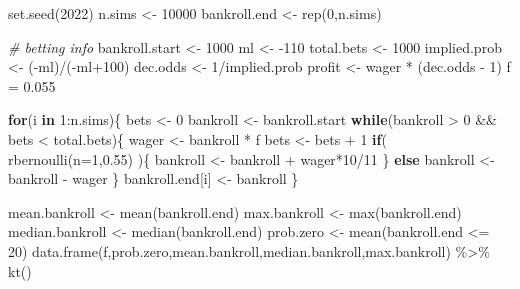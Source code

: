 \documentclass[
  11pt,
]{book}
\newenvironment{Shaded}{\begin{snugshade}}{\end{snugshade}}
\newcommand{\AttributeTok}[1]{\textcolor[rgb]{0.77,0.63,0.00}{#1}}
\newcommand{\CommentTok}[1]{\textcolor[rgb]{0.56,0.35,0.01}{\textit{#1}}}
\newcommand{\ControlFlowTok}[1]{\textcolor[rgb]{0.13,0.29,0.53}{\textbf{#1}}}
\newcommand{\DecValTok}[1]{\textcolor[rgb]{0.00,0.00,0.81}{#1}}
\newcommand{\FloatTok}[1]{\textcolor[rgb]{0.00,0.00,0.81}{#1}}
\newcommand{\FunctionTok}[1]{\textcolor[rgb]{0.00,0.00,0.00}{#1}}
\newcommand{\NormalTok}[1]{#1}
\newcommand{\OtherTok}[1]{\textcolor[rgb]{0.56,0.35,0.01}{#1}}
\newcommand{\SpecialCharTok}[1]{\textcolor[rgb]{0.00,0.00,0.00}{#1}}
\theoremstyle{definition}
\theoremstyle{definition}
\theoremstyle{definition}
\theoremstyle{definition}
\theoremstyle{remark}
\begin{document}
\begin{Shaded}
\begin{Highlighting}[]
\FunctionTok{set.seed}\NormalTok{(}\DecValTok{2022}\NormalTok{)}
\NormalTok{n.sims }\OtherTok{\textless{}{-}} \DecValTok{10000}
\NormalTok{bankroll.end }\OtherTok{\textless{}{-}} \FunctionTok{rep}\NormalTok{(}\DecValTok{0}\NormalTok{,n.sims)}

\CommentTok{\# betting info}
\NormalTok{bankroll.start }\OtherTok{\textless{}{-}} \DecValTok{1000}
\NormalTok{ml }\OtherTok{\textless{}{-}} \SpecialCharTok{{-}}\DecValTok{110}
\NormalTok{total.bets }\OtherTok{\textless{}{-}} \DecValTok{1000}
\NormalTok{implied.prob }\OtherTok{\textless{}{-}}\NormalTok{ (}\SpecialCharTok{{-}}\NormalTok{ml)}\SpecialCharTok{/}\NormalTok{(}\SpecialCharTok{{-}}\NormalTok{ml}\SpecialCharTok{+}\DecValTok{100}\NormalTok{)}
\NormalTok{dec.odds }\OtherTok{\textless{}{-}} \DecValTok{1}\SpecialCharTok{/}\NormalTok{implied.prob}
\NormalTok{profit }\OtherTok{\textless{}{-}}\NormalTok{ wager }\SpecialCharTok{*}\NormalTok{ (dec.odds }\SpecialCharTok{{-}} \DecValTok{1}\NormalTok{)}
\NormalTok{f }\OtherTok{=} \FloatTok{0.055}

\ControlFlowTok{for}\NormalTok{(i }\ControlFlowTok{in} \DecValTok{1}\SpecialCharTok{:}\NormalTok{n.sims)\{}
\NormalTok{  bets }\OtherTok{\textless{}{-}} \DecValTok{0}
\NormalTok{  bankroll }\OtherTok{\textless{}{-}}\NormalTok{ bankroll.start}
  \ControlFlowTok{while}\NormalTok{(bankroll }\SpecialCharTok{\textgreater{}} \DecValTok{0} \SpecialCharTok{\&\&}\NormalTok{ bets }\SpecialCharTok{\textless{}}\NormalTok{ total.bets)\{}
\NormalTok{    wager }\OtherTok{\textless{}{-}}\NormalTok{ bankroll }\SpecialCharTok{*}\NormalTok{ f}
\NormalTok{    bets }\OtherTok{\textless{}{-}}\NormalTok{ bets }\SpecialCharTok{+} \DecValTok{1}
    \ControlFlowTok{if}\NormalTok{( }\FunctionTok{rbernoulli}\NormalTok{(}\AttributeTok{n=}\DecValTok{1}\NormalTok{,}\FloatTok{0.55}\NormalTok{) )\{}
\NormalTok{      bankroll }\OtherTok{\textless{}{-}}\NormalTok{ bankroll }\SpecialCharTok{+}\NormalTok{ wager}\SpecialCharTok{*}\DecValTok{10}\SpecialCharTok{/}\DecValTok{11}
\NormalTok{    \} }\ControlFlowTok{else}
\NormalTok{      bankroll }\OtherTok{\textless{}{-}}\NormalTok{ bankroll }\SpecialCharTok{{-}}\NormalTok{ wager}
\NormalTok{  \}}
\NormalTok{  bankroll.end[i] }\OtherTok{\textless{}{-}}\NormalTok{ bankroll}
\NormalTok{\}}

\NormalTok{mean.bankroll }\OtherTok{\textless{}{-}} \FunctionTok{mean}\NormalTok{(bankroll.end)}
\NormalTok{max.bankroll }\OtherTok{\textless{}{-}} \FunctionTok{max}\NormalTok{(bankroll.end)}
\NormalTok{median.bankroll }\OtherTok{\textless{}{-}} \FunctionTok{median}\NormalTok{(bankroll.end)}
\NormalTok{prob.zero }\OtherTok{\textless{}{-}} \FunctionTok{mean}\NormalTok{(bankroll.end }\SpecialCharTok{\textless{}=} \DecValTok{20}\NormalTok{)}
\FunctionTok{data.frame}\NormalTok{(f,prob.zero,mean.bankroll,median.bankroll,max.bankroll) }\SpecialCharTok{\%\textgreater{}\%} \FunctionTok{kt}\NormalTok{()}
\end{Highlighting}
\end{Shaded}
\end{document}
